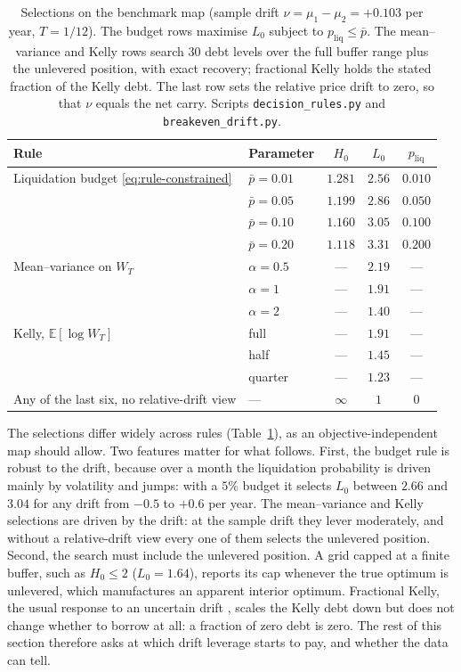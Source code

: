 \documentclass[11pt]{article}
\newcommand{\E}{\mathbb{E}}
\theoremstyle{plain}
\theoremstyle{definition}
\theoremstyle{remark}
\begin{document}
\begin{table}[ht]
\centering
\small
\begin{tabular}{llccc}
\toprule
Rule & Parameter & $H_0$ & $L_0$ & $p_{\mathrm{liq}}$ \\
\midrule
Liquidation budget \eqref{eq:rule-constrained} & $\bar p=0.01$ & $1.281$ & $2.56$ & $0.010$ \\
 & $\bar p=0.05$ & $1.199$ & $2.86$ & $0.050$ \\
 & $\bar p=0.10$ & $1.160$ & $3.05$ & $0.100$ \\
 & $\bar p=0.20$ & $1.118$ & $3.31$ & $0.200$ \\
\midrule
Mean--variance on $W_T$ & $\alpha=0.5$ & --- & $2.19$ & --- \\
 & $\alpha=1$ & --- & $1.91$ & --- \\
 & $\alpha=2$ & --- & $1.40$ & --- \\
Kelly, $\E[\log W_T]$ & full & --- & $1.91$ & --- \\
 & half & --- & $1.45$ & --- \\
 & quarter & --- & $1.23$ & --- \\
\midrule
Any of the last six, no relative-drift view & --- & $\infty$ & $1$ & $0$ \\
\bottomrule
\end{tabular}
\caption{Selections on the benchmark map (sample drift $\nu=\mu_1-\mu_2=+0.103$ per year,
$T=1/12$). The budget rows maximise $L_0$ subject to $p_{\mathrm{liq}}\le\bar p$. The
mean--variance and Kelly rows search $30$ debt levels over the full buffer range plus the
unlevered position, with exact recovery; fractional Kelly holds the stated fraction of the Kelly
debt. The last row sets the relative price drift to zero, so that $\nu$ equals the net carry. Scripts \texttt{decision\_rules.py} and
\texttt{breakeven\_drift.py}.}
\label{tab:rules}
\end{table}

The selections differ widely across rules (Table~\ref{tab:rules}), as an objective-independent map
should allow. Two features matter for what follows. First, the budget rule is robust to the drift,
because over a month the liquidation probability is driven mainly by volatility and jumps: with a
$5\%$ budget it selects $L_0$ between $2.66$ and $3.04$ for any drift from $-0.5$ to $+0.6$ per year.
The mean--variance and Kelly selections are driven by the drift: at the sample drift they lever
moderately, and without a relative-drift view every one of them selects the unlevered position. Second, the search must include the unlevered position. A grid capped at a finite buffer,
such as $H_0\le2$ ($L_0=1.64$), reports its cap whenever the true optimum is unlevered, which
manufactures an apparent interior optimum. Fractional Kelly, the usual response to an uncertain
drift \citep{MacLeanThorpZiemba2011}, scales the Kelly debt down but does not change whether to
borrow at all: a fraction of zero debt is zero. The rest of this section therefore asks at which
drift leverage starts to pay, and whether the data can tell.
\end{document}

